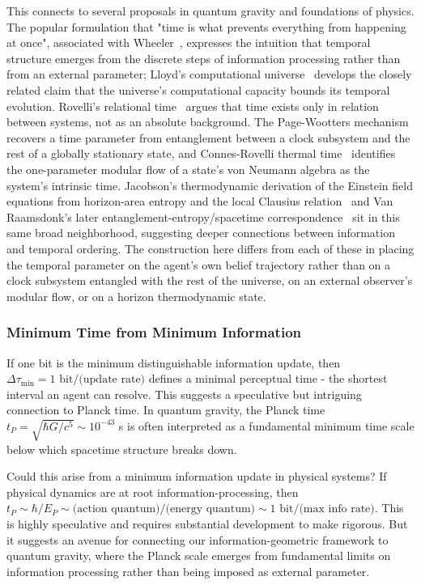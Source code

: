 \documentclass[11pt]{article}
\begin{document}
This connects to several proposals in quantum gravity and foundations of physics. The popular formulation that "time is what prevents everything from happening at once", associated with Wheeler~\cite{Wheeler1990}, expresses the intuition that temporal structure emerges from the discrete steps of information processing rather than from an external parameter; Lloyd's computational universe~\cite{Lloyd2002} develops the closely related claim that the universe's computational capacity bounds its temporal evolution. Rovelli's relational time~\cite{Rovelli2004} argues that time exists only in relation between systems, not as an absolute background. The Page-Wootters mechanism~\cite{PageWootters1983} recovers a time parameter from entanglement between a clock subsystem and the rest of a globally stationary state, and Connes-Rovelli thermal time~\cite{ConnesRovelli1994} identifies the one-parameter modular flow of a state's von Neumann algebra as the system's intrinsic time. Jacobson's thermodynamic derivation of the Einstein field equations from horizon-area entropy and the local Clausius relation~\cite{Jacobson1995} and Van Raamsdonk's later entanglement-entropy/spacetime correspondence~\cite{VanRaamsdonk2010} sit in this same broad neighborhood, suggesting deeper connections between information and temporal ordering. The construction here differs from each of these in placing the temporal parameter on the agent's own belief trajectory rather than on a clock subsystem entangled with the rest of the universe, on an external observer's modular flow, or on a horizon thermodynamic state.

\subsubsection{Minimum Time from Minimum Information}

If one bit is the minimum distinguishable information update, then $\Delta \tau_{\min} = 1 \text{ bit} / \text{(update rate)}$ defines a minimal perceptual time - the shortest interval an agent can resolve. This suggests a speculative but intriguing connection to Planck time. In quantum gravity, the Planck time $t_P = \sqrt{\hbar G/c^5} \sim 10^{-43}$ s is often interpreted as a fundamental minimum time scale below which spacetime structure breaks down.

Could this arise from a minimum information update in physical systems? If physical dynamics are at root information-processing, then $t_P \sim \hbar/E_P \sim \text{(action quantum)}/\text{(energy quantum)} \sim 1 \text{ bit}/\text{(max info rate)}$. This is highly speculative and requires substantial development to make rigorous. But it suggests an avenue for connecting our information-geometric framework to quantum gravity, where the Planck scale emerges from fundamental limits on information processing rather than being imposed as external parameter.
\end{document}
